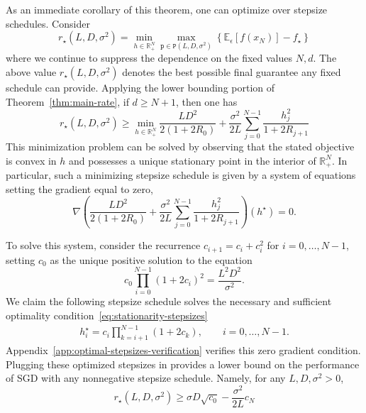 \documentclass[11pt, hidelinks]{article}
\begin{document}
As an immediate corollary of this theorem, one can optimize over stepsize schedules. Consider
\begin{equation} \label{eq:minimax-design}
    r_\star(L,D,\sigma^2) = \min_{h\in\mathbb{R}^N_+} \max_{\mathtt{p} \in \mathtt{P}(L,D,\sigma^2)} \left\{\mathbb{E}_{\epsilon} \left[f(x_N)\right] - f_\star \right\}
\end{equation}
where we continue to suppress the dependence on the fixed values $N,d$. The above value $r_\star(L,D,\sigma^2)$ denotes the best possible final guarantee any fixed schedule can provide. Applying the lower bounding portion of Theorem~\ref{thm:main-rate}, if $d\geq N+1$, then one has
\begin{equation} \label{eq:minimized-LB}
    r_\star(L,D,\sigma^2) \geq \min_{h\in\mathbb{R}^N_+} \frac{LD^2}{
        2\left(1+2R_0\right)
        }
        +
        \frac{\sigma^2}{2L}
        \sum_{j=0}^{N-1}
        \frac{h_j^2}{
        1+2R_{j+1}
        }
\end{equation}
This minimization problem can be solved by observing that the stated objective is convex in $h$ and possesses a unique stationary point in the interior of $\mathbb{R}^N_+$. In particular, such a minimizing stepsize schedule is given by a system of equations setting the gradient equal to zero,
\begin{equation}\label{eq:stationarity-stepsizes}
    \nabla \left(\frac{LD^2}{
        2\left(1+2R_0\right)
        }
        +
        \frac{\sigma^2}{2L}
        \sum_{j=0}^{N-1}
        \frac{h_j^2}{
        1+2R_{j+1}
        }\right) (h^\star)= 0.
\end{equation}

To solve this system, consider the recurrence $c_{i+1}=c_i+c_i^2$ for $i=0,\dots,N-1$, setting $c_0$ as the unique positive solution to the equation
\begin{equation*}
c_0\prod_{i=0}^{N-1} \left(1+2c_i\right)^2 = \frac{L^2D^2}{\sigma^2}.
\end{equation*}
We claim the following stepsize schedule solves the necessary and sufficient optimality condition~\eqref{eq:stationarity-stepsizes}
\begin{align}
h_i^\star = c_i \prod_{k=i+1}^{N-1}\left(1+2c_k\right), \qquad i=0,\dots,N-1. \label{eq:optimal-steps}
\end{align}
Appendix~\ref{app:optimal-stepsizes-verification} verifies this zero gradient condition.
Plugging these optimized stepsizes in provides a lower bound on the performance of SGD with any nonnegative stepsize schedule. Namely, for any $L,D,\sigma^2>0$,
\begin{equation} \label{eq:general-LB}
    r_\star(L,D,\sigma^2) \geq  \sigma D \sqrt{c_0} - \frac{\sigma^2}{2L}c_N
\end{equation}
\end{document}
